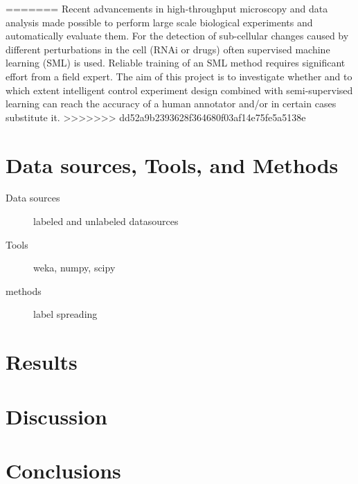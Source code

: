 \documentclass[oneside, a4paper, final]{memoir} %
\begin{document}
=======
	Recent advancements in high-throughput microscopy and data analysis made possible to perform large 
	scale biological experiments and automatically evaluate them. For the detection of sub-cellular changes 
	caused by different perturbations in the cell (RNAi or drugs) often supervised machine learning (SML) 
	is used. Reliable training of an SML method requires significant effort from a field expert. The aim of 
	this project is to investigate whether and to which extent intelligent control experiment design 
	combined with semi-supervised learning can reach the accuracy of a human annotator and/or in certain 
	cases substitute it.
>>>>>>> dd52a9b2393628f364680f03af14e75fe5a5138e

\section{Data sources, Tools, and Methods}
\begin{description}
	\item[Data sources]
	labeled and unlabeled datasources
	\item[Tools] weka, numpy, scipy
	\item[methods] label spreading
\end{description}

\section{Results}
\lipsum[8]

\section{Discussion}
\lipsum[9]

\section{Conclusions}
\lipsum[3]
\nocite{duda2001pattern, chapelle2006semi, hall2009weka}


\end{document}
